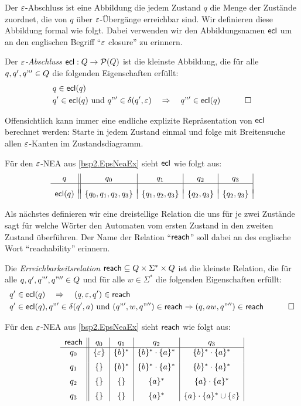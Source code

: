 Der $\varepsilon$-Abschluss ist eine Abbildung die jedem Zustand $q$ die Menge der Zustände zuordnet, die von $q$ über $\varepsilon$-Übergänge erreichbar sind.
Wir definieren diese Abbildung formal wie folgt. Dabei verwenden wir den Abbildungsnamen $\textsf{ecl}$ um an den englischen Begriff "`$\varepsilon$ closure"' zu erinnern.
\begin{Def}
 Der \emph{$\varepsilon$-Abschluss} $\textsf{ecl}:Q\rightarrow\mathcal{P}(Q)$ ist die kleinste Abbildung, die für alle $q,q',q"'\in Q$ die folgenden Eigenschaften erfüllt:
 \begin{eqnarray*}
  & q\in\textsf{ecl}(q) &\\
  & q'\in\textsf{ecl}(q) \text{ und } q"'\in\delta(q',\varepsilon) \quad\Rightarrow\quad q"'\in\textsf{ecl}(q) & \qedhere
 \end{eqnarray*}
\end{Def}
Offensichtlich kann immer eine endliche explizite Repräsentation von $\textsf{ecl}$ berechnet werden: Starte in jedem Zustand einmal und folge mit Breitensuche allen $\varepsilon$-Kanten im Zustandsdiagramm.

Für den $\varepsilon$-NEA aus \autoref{bsp2.EpsNeaEx} sieht $\textsf{ecl}$ wie folgt aus:
$$
\begin{array}{c||c|c|c|c|c|c}
   q  & q_0 & q_1 & q_2 & q_3\\ \hline
& & & &\\[-.5em]
\textsf{ecl}(q) & \{q_0, q_1, q_2, q_3\} & \{q_1, q_2, q_3\} & \{q_2, q_3\} & \{q_2, q_3\}
\end{array}
$$

Als nächstes definieren wir eine dreistellige Relation die uns für je zwei Zustände sagt für welche Wörter den Automaten vom ersten Zustand in den zweiten Zustand überführen. Der Name der Relation "`$\textsf{reach}$"' soll dabei an des englische Wort "`reachability"' erinnern.

\begin{Def}
 Die \emph{Erreichbarkeitsrelation} $\textsf{reach}\subseteq Q\times\Sigma^*\times Q$ ist die kleinste Relation, die für alle $q,q',q"',q"''\in Q$ und für alle $w\in\Sigma^*$ die folgenden Eigenschaften erfüllt:
  \begin{eqnarray*}
& q'\in\textsf{ecl}(q) \quad\Rightarrow\quad (q,\varepsilon,q')\in\textsf{reach} &\\
& q'\in\textsf{ecl}(q), q"'\in\delta(q',a) \text{ und } (q"',w,q"'')\in\textsf{reach} \Rightarrow (q,aw,q"'')\in\textsf{reach} & \qedhere
 \end{eqnarray*}
\end{Def}

Für den $\varepsilon$-NEA aus \autoref{bsp2.EpsNeaEx} sieht $\textsf{reach}$ wie folgt aus:
$$
\begin{array}{c||c|c|c|c|c|c}
   \textsf{reach}  & q_0 & q_1 & q_2 & q_3\\ \hline
q_0 & \{\varepsilon\} & \{b\}^* & \{b\}^*\cdot\{a\}^* & \{b\}^*\cdot\{a\}^* \\[2mm]
q_1 & \{\}     & \{b\}^* & \{b\}^*\cdot\{a\}^* & \{b\}^*\cdot\{a\}^* \\[2mm]
q_2 & \{\}     & \{\}    & \{a\}^*             & \{a\}\cdot\{a\}^*\\[2mm]
q_3 & \{\}     & \{\}    & \{a\}^*             & \{a\}\cdot\{a\}^*\cup\{\varepsilon\}
\end{array}
$$


